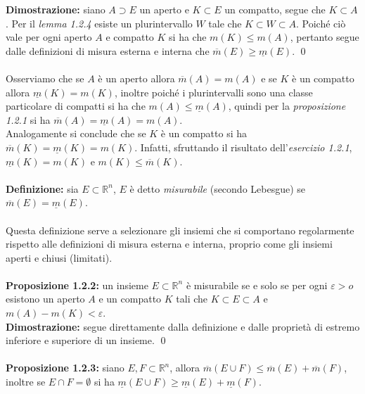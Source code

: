 \documentclass{article}
\numberwithin{equation}{subsection}
\begin{document}
\textbf{Dimostrazione:} siano $A \supset E$ un aperto e $K \subset E$ un compatto, segue che $K \subset A$. Per il \textit{lemma 1.2.4} esiste un plurintervallo $W$ tale che $K \subset W \subset A$. Poiché ciò vale per ogni aperto $A$ e compatto $K$ si ha che $m(K) \leq m(A)$, pertanto segue dalle definizioni di misura esterna e interna che $\overline{m}(E) \geq \underline{m}(E)$. \qed \\ \\
Osserviamo che se $A$ è un aperto allora $\overline{m}(A) = m(A)$ e se $K$ è un compatto allora $\underline{m}(K) = m(K)$, inoltre poiché i plurintervalli sono una classe particolare di compatti si ha che $m(A) \leq \underline{m}(A)$, quindi per la \textit{proposizione 1.2.1} si ha $\overline{m}(A) = \underline{m}(A) = m(A)$. \\
Analogamente si conclude che se $K$ è un compatto si ha $\overline{m}(K) = \underline{m}(K) = m(K)$. Infatti, sfruttando il risultato dell'\textit{esercizio 1.2.1}, $\underline{m}(K) = m(K)$ e $m(K) \leq \overline{m}(K)$. \\ \\
\textbf{Definizione:} sia $E \subset \mathbb{R}^n$, $E$ è detto \textit{misurabile} (secondo Lebesgue) se $\overline{m}(E) = \underline{m}(E)$. \\ \\
Questa definizione serve a selezionare gli insiemi che si comportano regolarmente rispetto alle definizioni di misura esterna e interna, proprio come gli insiemi aperti e chiusi (limitati). \\ \\
\textbf{Proposizione 1.2.2:} un insieme $E \subset \mathbb{R}^n$ è misurabile se e solo se per ogni $\varepsilon > o$ esistono un aperto $A$ e un compatto $K$ tali che $K \subset E \subset A$ e $m(A) - m(K) < \varepsilon$. \\

\textbf{Dimostrazione:} segue direttamente dalla definizione e dalle proprietà di estremo inferiore e superiore di un insieme. \qed \\ \\
\textbf{Proposizione 1.2.3:} siano $E, F \subset \mathbb{R}^n$, allora $\overline{m}(E \cup F) \leq \overline{m}(E) + \overline{m}(F)$, inoltre se $E \cap F = \emptyset$ si ha $\underline{m}(E \cup F) \geq \underline{m}(E) + \underline{m}(F)$. \\
\end{document}

